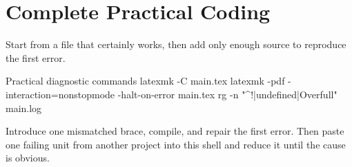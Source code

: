\section{Complete Practical Coding}
\label{sec:practical-19}

Start from a file that certainly works, then add only enough source to
reproduce the first error.


\begin{terminalcode}{Practical diagnostic commands}
latexmk -C main.tex
latexmk -pdf -interaction=nonstopmode -halt-on-error main.tex
rg -n "^!|undefined|Overfull" main.log
\end{terminalcode}

\begin{codelab}
Introduce one mismatched brace, compile, and repair the first error. Then paste
one failing unit from another project into this shell and reduce it until the
cause is obvious.
\end{codelab}

